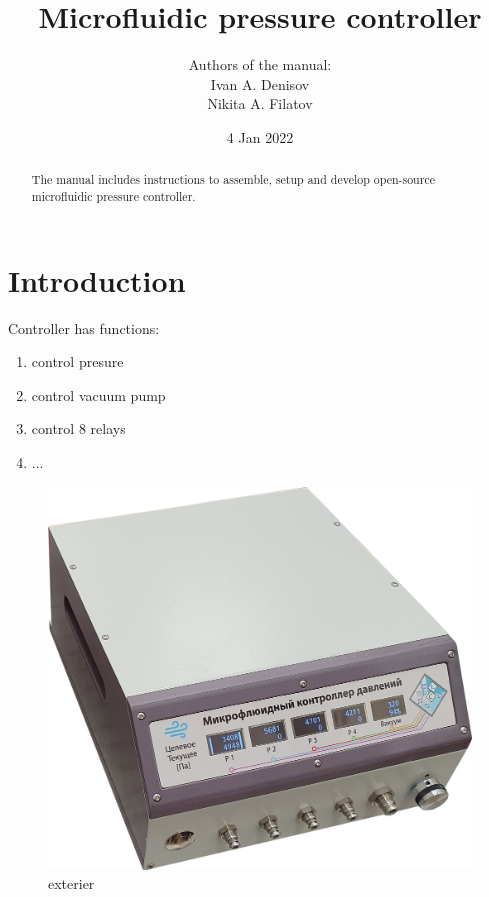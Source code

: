 \documentclass[twoside, 12pt, a4paper]{refart}
\title{Microfluidic pressure controller}
\author{
Authors of the manual: \\
Ivan A. Denisov \\
Nikita A. Filatov \\
}
\date{4 Jan 2022}
\begin{document}
\maketitle

\begin{abstract}
The manual includes instructions to assemble, setup and develop open-source microfluidic pressure controller.
\end{abstract}

\tableofcontents

\newpage



\section{Introduction}
\label{intro}

Controller has functions:
\begin{enumerate}

\item control presure
    
\item control vacuum pump

\item control 8 relays

\item ...
        
\end{enumerate}

\begin{figure}[h!b]
	\begin{center}
	\includegraphics[width=\textwidth]{imgs/device.jpg}
	\caption{exterier}
	\label{fig:device}
	\end{center}
\end{figure}
\end{document}
